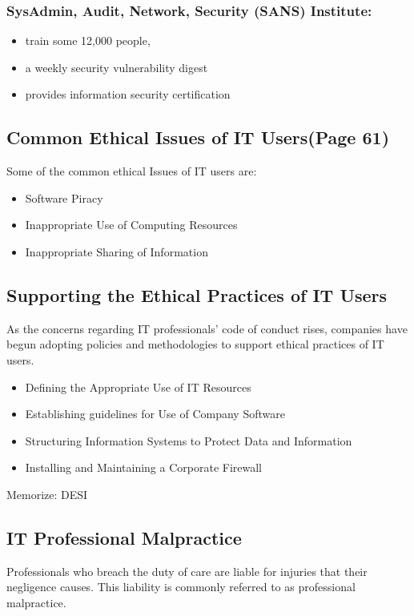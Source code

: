 \documentclass[11pt]{article}
\begin{document}
\subsubsection{SysAdmin, Audit, Network, Security (SANS) Institute:}
\label{sec:orge4f9142}
\begin{itemize}
\item train some 12,000 people,
\item a weekly security vulnerability digest
\item provides information security certification
\end{itemize}
\subsection{Common Ethical Issues of IT Users(Page 61)}
\label{sec:org4dc1cf3}
Some of the common ethical Issues of IT users are:
\begin{itemize}
\item Software Piracy
\item Inappropriate Use of Computing Resources
\item Inappropriate Sharing of Information
\end{itemize}

\subsection{Supporting the Ethical Practices of IT Users}
\label{sec:org56d3868}
As the concerns regarding IT professionals' code of conduct rises, companies have begun adopting policies and methodologies to support ethical practices of IT users.
\begin{itemize}
\item Defining the Appropriate Use of IT Resources
\item Establishing guidelines for Use of Company Software
\item Structuring Information Systems to Protect Data and Information
\item Installing and Maintaining a Corporate Firewall
\end{itemize}
Memorize: DESI

\subsection{IT Professional Malpractice}
\label{sec:orgeb3f7ef}
Professionals who breach the duty of care are liable for injuries that their negligence causes. This liability is commonly referred to as professional malpractice.
\end{document}
